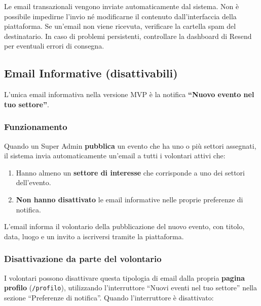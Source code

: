 \documentclass[a4paper,11pt,oneside]{book}
\newcommand{\percorso}[1]{\textcolor{namoCyan}{\texttt{#1}}}
\begin{document}
\begin{warningbox}
Le email transazionali vengono inviate automaticamente dal sistema. Non \`e possibile impedirne l'invio n\'e modificarne il contenuto dall'interfaccia della piattaforma. Se un'email non viene ricevuta, verificare la cartella spam del destinatario. In caso di problemi persistenti, controllare la dashboard di Resend per eventuali errori di consegna.
\end{warningbox}

\subsection{Email Informative (disattivabili)}
\label{sec:email-informative}

L'unica email informativa nella versione MVP \`e la notifica \textbf{``Nuovo evento nel tuo settore''}.

\subsubsection{Funzionamento}

Quando un Super Admin \textbf{pubblica} un evento che ha uno o pi\`u settori assegnati, il sistema invia automaticamente un'email a tutti i volontari attivi che:

\begin{enumerate}[leftmargin=1.5em]
  \item Hanno almeno un \textbf{settore di interesse} che corrisponde a uno dei settori dell'evento.
  \item \textbf{Non hanno disattivato} le email informative nelle proprie preferenze di notifica.
\end{enumerate}

L'email informa il volontario della pubblicazione del nuovo evento, con titolo, data, luogo e un invito a iscriversi tramite la piattaforma.

\subsubsection{Disattivazione da parte del volontario}

I volontari possono disattivare questa tipologia di email dalla propria \textbf{pagina profilo} (\percorso{/profilo}), utilizzando l'interruttore ``Nuovi eventi nel tuo settore'' nella sezione ``Preferenze di notifica''. Quando l'interruttore \`e disattivato:
\end{document}
